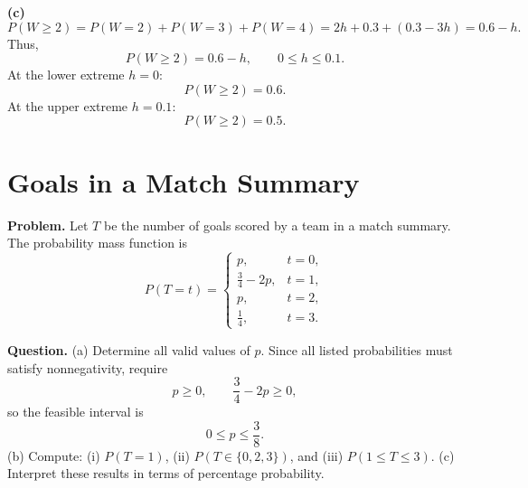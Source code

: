 		\textbf{(c)}
		\[
		P(W\ge 2)=P(W=2)+P(W=3)+P(W=4)=2h+0.3+(0.3-3h)=0.6-h.
		\]
		Thus,
		\[
		P(W\ge 2)=0.6-h,\qquad 0\le h\le 0.1.
		\]
		At the lower extreme $h=0$:
		\[
		P(W\ge 2)=0.6.
		\]
		At the upper extreme $h=0.1$:
		\[
		P(W\ge 2)=0.5.
		\]
		\begin{center}
		\hspace{0.35cm}
		\end{center}
		
		\section{Goals in a Match Summary}
		
		\textbf{Problem.}
		Let $T$ be the number of goals scored by a team in a match summary. The probability mass function is
		\[
		P(T=t)=\begin{cases}
			p, & t=0,\\
			\frac{3}{4}-2p, & t=1,\\
			p, & t=2,\\
			\frac{1}{4}, & t=3.
		\end{cases}
		\]
		
		\textbf{Question.}
		(a) Determine all valid values of $p$. Since all listed probabilities must satisfy nonnegativity, require
		\[
		p\ge 0,\qquad \frac{3}{4}-2p\ge 0,
		\]
		so the feasible interval is
		\[
		0\le p\le \frac{3}{8}.
		\]
		(b) Compute: (i) $P(T=1)$, (ii) $P(T\in\{0,2,3\})$, and (iii) $P(1\le T\le 3)$.
		(c) Interpret these results in terms of percentage probability.
		
